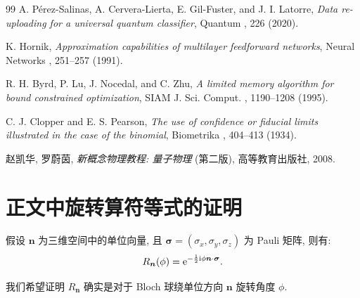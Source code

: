 \documentclass[a4paper]{ctexart}
\begin{document}
\begin{thebibliography}{99}
    A. Pérez-Salinas, A. Cervera-Lierta, E. Gil-Fuster, and J. I. Latorre,
    \textit{Data re-uploading for a universal quantum classifier},
    Quantum , 226 (2020).

    K. Hornik,
    \textit{Approximation capabilities of multilayer feedforward networks},
    Neural Networks , 251--257 (1991).

    R. H. Byrd, P. Lu, J. Nocedal, and C. Zhu,
    \textit{A limited memory algorithm for bound constrained optimization},
    SIAM J. Sci. Comput. , 1190--1208 (1995).

    C. J. Clopper and E. S. Pearson,
    \textit{The use of confidence or fiducial limits illustrated in the case of the binomial},
    Biometrika , 404--413 (1934).

    赵凯华, 罗蔚茵,
    \textit{新概念物理教程: 量子物理} (第二版),
    高等教育出版社, 2008.
\end{thebibliography}

\appendix

\section{正文中旋转算符等式的证明} \label{app:proof_rotation}

假设 $\bm{n}$ 为三维空间中的单位向量, 且 $\bm{\sigma}=(\sigma_x,\sigma_y,\sigma_z)$ 为 Pauli 矩阵, 则有:
\begin{equation}
    R_{\bm{n}}(\phi)=\mathrm{e}^{-\frac{1}{2}\mathrm{i}\phi\bm{n}\cdot\bm{\sigma}}.
\end{equation}

我们希望证明 $R_{\bm{n}}$ 确实是对于 Bloch 球绕单位方向 $\bm{n}$ 旋转角度 $\phi$.
\end{document}

